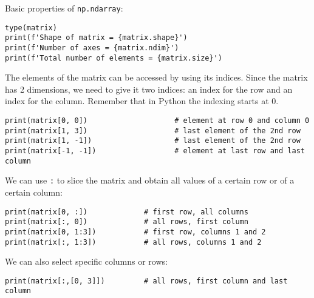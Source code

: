 \documentclass[12pt, a4paper]{article}
\begin{document}
Basic properties of \texttt{np.ndarray}:
\lstset{language=jupyter-python,label= ,caption= ,captionpos=b,numbers=none}
\begin{lstlisting}
type(matrix)
print(f'Shape of matrix = {matrix.shape}')
print(f'Number of axes = {matrix.ndim}')
print(f'Total number of elements = {matrix.size}')
\end{lstlisting}
The elements of the matrix can be accessed by using its indices.
Since the matrix has 2 dimensions, we need to give it two indices: an index for the row and an index for the column. Remember that in Python the indexing starts at 0.
\lstset{language=jupyter-python,label= ,caption= ,captionpos=b,numbers=none}
\begin{lstlisting}
print(matrix[0, 0])                    # element at row 0 and column 0
print(matrix[1, 3])                    # last element of the 2nd row
print(matrix[1, -1])                   # last element of the 2nd row
print(matrix[-1, -1])                  # element at last row and last column
\end{lstlisting}
We can use \texttt{:} to slice the matrix and obtain all values of a certain row or of a certain column:
\lstset{language=jupyter-python,label= ,caption= ,captionpos=b,numbers=none}
\begin{lstlisting}
print(matrix[0, :])             # first row, all columns
print(matrix[:, 0])             # all rows, first column
print(matrix[0, 1:3])           # first row, columns 1 and 2
print(matrix[:, 1:3])           # all rows, columns 1 and 2
\end{lstlisting}
We can also select specific columns or rows:
\lstset{language=jupyter-python,label= ,caption= ,captionpos=b,numbers=none}
\begin{lstlisting}
print(matrix[:,[0, 3]])         # all rows, first column and last column
\end{lstlisting}
\end{document}
